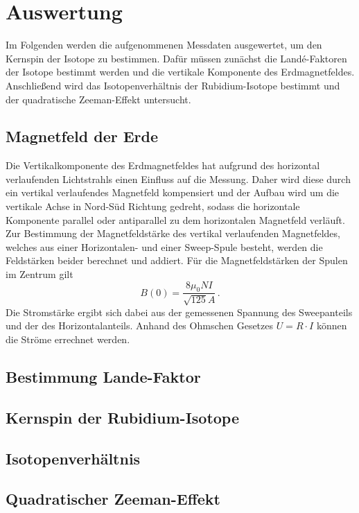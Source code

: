 \section{Auswertung}
\label{sec:auswertung}

Im Folgenden werden die aufgenommenen Messdaten ausgewertet, um den Kernspin der Isotope zu bestimmen.
Dafür müssen zunächst die Landé-Faktoren der Isotope bestimmt werden und die vertikale Komponente des Erdmagnetfeldes.
Anschließend wird das Isotopenverhältnis der Rubidium-Isotope bestimmt und der quadratische Zeeman-Effekt untersucht.

\subsection{Magnetfeld der Erde}
\label{sec:magnetfeld-der-erde}

Die Vertikalkomponente des Erdmagnetfeldes hat aufgrund des horizontal verlaufenden Lichtstrahls einen Einfluss auf die Messung.
Daher wird diese durch ein vertikal verlaufendes Magnetfeld kompensiert und der Aufbau wird um die vertikale Achse in Nord-Süd Richtung gedreht,
sodass die horizontale Komponente parallel oder antiparallel zu dem horizontalen Magnetfeld verläuft.
Zur Bestimmung der Magnetfeldstärke des vertikal verlaufenden Magnetfeldes, welches aus einer Horizontalen- und einer Sweep-Spule besteht, werden die Feldstärken
beider berechnet und addiert.
Für die Magnetfeldstärken der Spulen im Zentrum gilt
\begin{equation}
    B(0) = \frac{8  \mu_0  N I}{\sqrt{125} A}  \, .
\end{equation}
Die Stromstärke ergibt sich dabei aus der gemessenen Spannung des Sweepanteils und der des Horizontalanteils.
Anhand des Ohmschen Gesetzes $U = R \cdot I$ können die Ströme errechnet werden.

\subsection{Bestimmung Lande-Faktor}
\label{sec:best-lande-faktoren}




\subsection{Kernspin der Rubidium-Isotope}
\label{sec:Kernspin der Rubidium-Isotope}

\subsection{Isotopenverhältnis}
\label{sec:Isotopenverhältnis}

\subsection{Quadratischer Zeeman-Effekt}
\label{sec:quadratischer-zeeman-effekt}